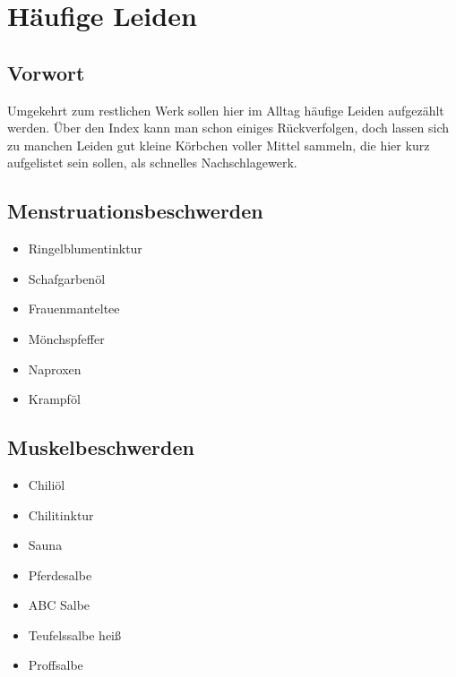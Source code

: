 \chapter{Häufige Leiden}

\section{Vorwort}

Umgekehrt zum restlichen Werk sollen hier im Alltag häufige Leiden aufgezählt werden. Über den Index kann man schon einiges Rückverfolgen, doch lassen sich zu manchen Leiden gut kleine Körbchen voller Mittel sammeln, die hier kurz aufgelistet sein sollen, als schnelles Nachschlagewerk.


\section{Menstruationsbeschwerden}


\begin{itemize}
	\item Ringelblumentinktur
	\item Schafgarbenöl
	\item Frauenmanteltee
	\item Mönchspfeffer
	\item Naproxen
	\item Krampföl
\end{itemize}



\section{Muskelbeschwerden}
   


\begin{itemize}
	\item Chiliöl
	\item Chilitinktur
	\item Sauna
	\item Pferdesalbe
	\item ABC Salbe
	\item Teufelssalbe heiß
	\item Proffsalbe	
\end{itemize}



